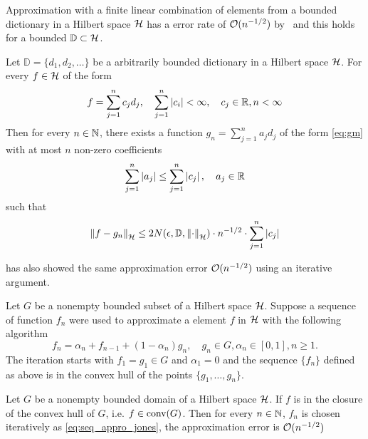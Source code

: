 Approximation with a finite linear combination of elements from a bounded
dictionary in a Hilbert space $\mathcal{H}$ has a error rate of $\mathcal{O}(n^{-1/2})$
by~\cite{pisierRemarquesResultatNon1980} and this holds for a bounded
$\mathbb{D} \subset \mathcal{H}$.

\begin{theorem}
    \label{thm:maurey}
    Let $\mathbb{D} = \{d_1, d_2, \dots\}$ be a arbitrarily bounded dictionary
    in a Hilbert space $\mathcal{H}$. For every $f \in \mathcal{H}$ of the form
    \begin{equation}
        f = \sum_{j=1}^n c_j d_j, \quad
        \sum_{j=1}^n \left| c_i \right| < \infty, \quad
        c_j \in \mathbb{R}, n < \infty
    \end{equation}
    Then for every $n \in \mathbb{N}$, there exists a function $g_n = \sum_{j=1}^n a_j
    d_j$ of the form \eqref{eq:gm} with at most $n$ non-zero coefficients
    \begin{equation}
        \sum_{j=1}^n \left| a_j \right| \leq
        \sum_{j=1}^n \left| c_j \right|, 
        \quad a_j \in \mathbb{R}
    \end{equation}
    such that
    \begin{equation}
        \left\| f - g_n \right\|_{\mathcal{H}} \leq
        2 N(\epsilon, \mathbb{D}, \left\| \cdot \right\|_{\mathcal{H}})
        \cdot n^{-1/2}
        \cdot \sum_{j=1}^n \left| c_j \right| 
    \end{equation}

\end{theorem}

\cite{jonesSimpleLemmaGreedy1992} has also showed the same approximation error
$\mathcal{O}(n^{-1/2})$ using an iterative argument. 

Let $G$ be a nonempty bounded subset of a Hilbert space $\mathcal{H}$. Suppose a
sequence of function $f_n$ were used to approximate a element $f$ in $\mathcal{H}$
with the following algorithm
\begin{equation}
    \label{eq:seq_appro_jones}
    f_n = \alpha_n + f_{n-1} + (1-\alpha_n) g_n, \quad
    g_n \in G, \alpha_n \in [0,1], n \geq 1.
\end{equation}
The iteration starts with $f_1 = g_1 \in G$ and $\alpha_1 = 0$ and the sequence
$\{f_n\}$ defined as above is in the convex hull of the points $\{g_1,\dots,
g_n\}$.

\begin{theorem}
    Let $G$ be a nonempty bounded domain of a Hilbert space $\mathcal{H}$. If $f$
    is in the closure of the convex hull of $G$, i.e. $f \in \textrm{conv}(G)$. Then for
    every $n \in \mathbb{N}$, $f_n$ is chosen iteratively as
    \eqref{eq:seq_appro_jones}, the approximation error is $\mathcal{O}(n^{-1/2})$
\end{theorem}

